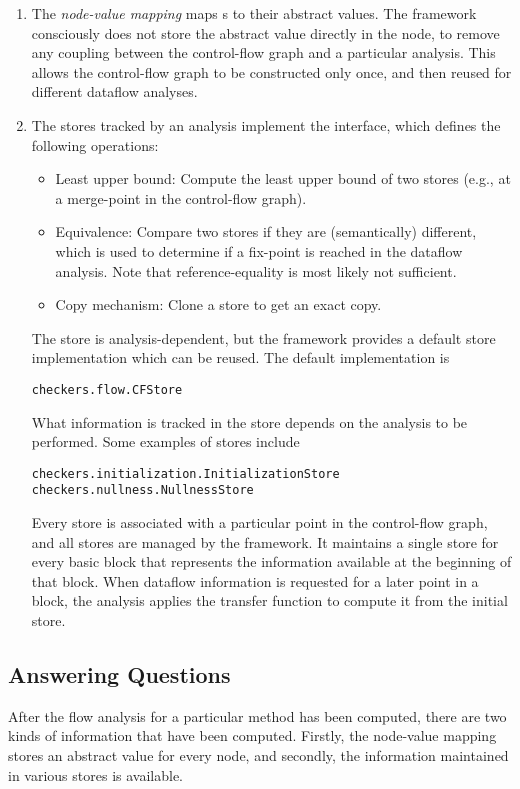 \begin{enumerate}
\item
The
\emph{node-value mapping} maps s to their abstract values.
The framework consciously does not store the abstract value directly in
the node, to remove any coupling between the control-flow graph and a particular analysis.
This allows the control-flow graph to be constructed only once, and then reused for different
dataflow analyses.

\item
The stores tracked by an analysis implement the  interface, which defines the
following operations:
\begin{itemize}
\item Least upper bound: Compute the least upper bound of two stores (e.g., at a merge-point
in the control-flow graph).
\item Equivalence: Compare two stores if they are (semantically) different, which is used
to determine if a fix-point is reached in the dataflow analysis. Note that reference-equality
is most likely not sufficient.
\item Copy mechanism: Clone a store to get an exact copy.
\end{itemize}
The store is analysis-dependent, but the framework provides a default store implementation
which can be reused.  The default implementation is
\begin{verbatim}checkers.flow.CFStore\end{verbatim}
What information is tracked in the store depends on the analysis to be performed.  Some examples of stores include
\begin{verbatim}
checkers.initialization.InitializationStore
checkers.nullness.NullnessStore
\end{verbatim}

Every store is associated with a particular point in the control-flow graph, and
all stores are managed by the framework. It maintains
a single store for every basic block that represents the information available at the
beginning of that block.  When dataflow information is requested for a later point in a block, the analysis applies the transfer function to compute it from the initial store.

\end{enumerate}


\subsection{Answering Questions}
After the flow analysis for a particular method has been computed, there are two kinds of
information that have been computed.  Firstly, the node-value mapping stores an abstract
value for every node, and secondly, the information maintained in various stores is
available.

